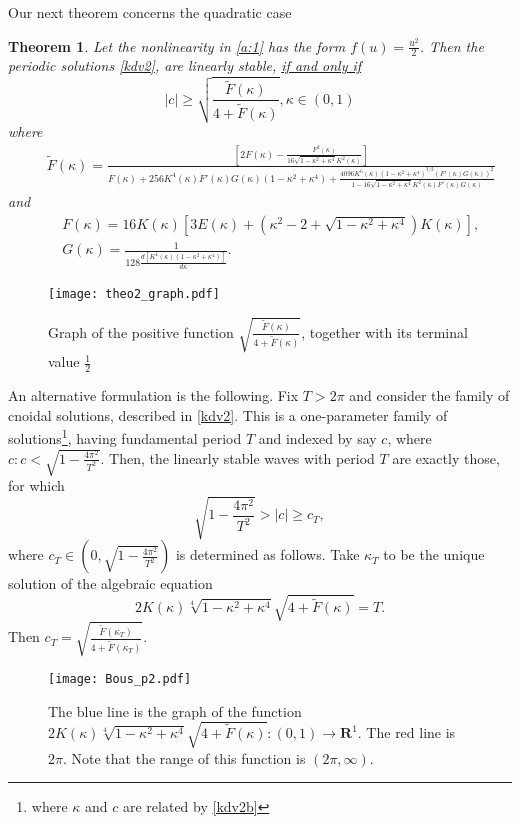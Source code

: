 \documentclass[final,11pt,leqno]{amsart}
\newtheorem{theorem}{Theorem}
\begin{document}
 Our next theorem concerns the quadratic case
 \begin{theorem}
\label{theo:2}
 Let the nonlinearity in \eqref{a:1} has the
 form $f(u)=\frac{u^2}{2}$. Then the periodic solutions \eqref{kdv2}, are linearly stable, \underline{if and only if}
 $$
 |c|\geq \sqrt{{\frac{{\widetilde{F}({\kappa})}}{{4+\widetilde{F}({\kappa})}}}}, {\kappa}\in (0,1)
 $$
 where
 \begin{eqnarray*}
 & & \tilde{F}({\kappa})={\frac{{\left[
       2F(\kappa)-{\frac{F^2(\kappa)}{16\sqrt{1-\kappa^2+\kappa^4}K^2(\kappa)}}\right] }}{{ F(\kappa)+256K^4(\kappa)F'(\kappa)G(\kappa)(1-\kappa^2+\kappa^4)+{\frac{{4096 K^6({\kappa})(1-{\kappa}^2+{\kappa}^4)^{3/2}(F'({\kappa}) G({\kappa}))^2}}{{1-16\sqrt{1-\kappa^2+\kappa^4}K^2(\kappa)F'(\kappa)G(\kappa)}}}}}}
 \end{eqnarray*}
 and
 \begin{eqnarray*}
 & & F(\kappa)=16K(\kappa)[3E(\kappa)+(\kappa^2-2+\sqrt{1-\kappa^2+\kappa^4})K(\kappa)], \\
 & & G({\kappa})=\frac{1}{128{\frac{d[K^4(\kappa)(1-\kappa^2+\kappa^4)]}{d\kappa}}}.
 \end{eqnarray*}
\end{theorem}
\begin{figure}[h3]
\centering
\texttt{[image: theo2\_graph.pdf]}
\caption{Graph of the positive function $\sqrt{{\frac{{\tilde{F}({\kappa})}}{{4+\tilde{F}({\kappa})}}}}$, together with its terminal value ${\frac{{1}}{{2}}}$}
\label{fig3}
\end{figure}
An alternative formulation is the following. Fix  $T>2\pi$ and consider the   family of cnoidal solutions, described in  \eqref{kdv2}. This is a one-parameter family of solutions\footnote{where ${\kappa}$ and $c$ are related by \eqref{kdv2b}}, having fundamental period $T$ and indexed by say $c$, where $c: c<\sqrt{1-{\frac{{4\pi^2}}{{T^2}}}}$. Then, the linearly stable waves with period $T$ are exactly  those, for which
 $$
 \sqrt{1-{\frac{{4\pi^2}}{{T^2}}}}>|c|\geq c_T,
 $$
 where $c_T\in (0, \sqrt{1-{\frac{{4\pi^2}}{{T^2}}}})$ is determined as follows. Take ${\kappa}_T$ to  be the unique solution of the algebraic equation
 $$
 2K({\kappa})\sqrt[4]{1-{\kappa}^2+{\kappa}^4}\sqrt{4+\tilde{F}({\kappa})}=T.
 $$
 Then $c_T= \sqrt{{\frac{{\widetilde{F}({\kappa}_T)}}{{4+\widetilde{F}({\kappa}_T)}}}}$.
 \begin{figure}[h4]
\centering
\texttt{[image: Bous\_p2.pdf]}
\caption{The blue line is the graph of the function $2K({\kappa})\sqrt[4]{1-{\kappa}^2+{\kappa}^4}\sqrt{4+\tilde{F}({\kappa})}:(0,1)\to {\mathbf R^1}$. The red line is $2\pi$. Note that the range of this function is $(2\pi, \infty)$.}
\label{fig4}
\end{figure}
\end{document}
